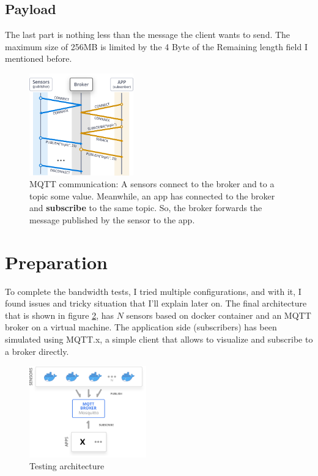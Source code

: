 \documentclass[journal]{IEEEtran}
\begin{document}
\subsection{Payload}
The last part is nothing less than the message the client wants to send. The maximum size of 256MB is limited by the 4 Byte of the Remaining length field I mentioned before. 
\begin{figure}[h]
	\centering
	\includegraphics[width=0.4\textwidth]{mqtt}
	\caption{MQTT communication: A sensors connect to the broker and  to a topic some value. Meanwhile, an app has connected to the broker and \textbf{subscribe} to the same topic. So, the broker forwards the message published by the sensor to the app.}
	\label{fig:flow}
\end{figure}

\section{Preparation}
To complete the bandwidth tests, I tried multiple configurations, and with it, I found issues and tricky situation that I'll explain later on. 
The final architecture that is shown in figure \ref{fig:strut}, has $N$ sensors based on docker container and an MQTT broker on a virtual machine. The application side (subscribers) has been simulated using MQTT.x, a simple client that allows to visualize and subscribe to a broker directly. 
\begin{figure}[h]
	\centering
	\includegraphics[width=0.45\textwidth]{struttura}
	\caption{Testing architecture}
	\label{fig:strut}
\end{figure}
\end{document}

